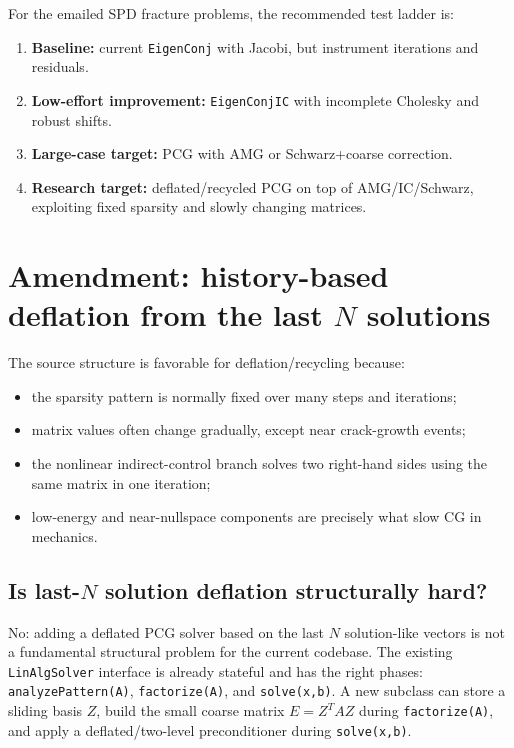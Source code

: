 \documentclass[10pt,a4paper]{article}
\newcommand{\code}[1]{\texttt{#1}}
\begin{document}
For the emailed SPD fracture problems, the recommended test ladder is:
\begin{enumerate}
  \item \textbf{Baseline:} current \code{EigenConj} with Jacobi, but instrument iterations and residuals.
  \item \textbf{Low-effort improvement:} \code{EigenConjIC} with incomplete Cholesky and robust shifts.
  \item \textbf{Large-case target:} PCG with AMG or Schwarz+coarse correction.
  \item \textbf{Research target:} deflated/recycled PCG on top of AMG/IC/Schwarz, exploiting fixed sparsity and slowly changing matrices.
\end{enumerate}


\section{Amendment: history-based deflation from the last $N$ solutions}

The source structure is favorable for deflation/recycling because:
\begin{itemize}
  \item the sparsity pattern is normally fixed over many steps and iterations;
  \item matrix values often change gradually, except near crack-growth events;
  \item the nonlinear indirect-control branch solves two right-hand sides using the same matrix in one iteration;
  \item low-energy and near-nullspace components are precisely what slow CG in mechanics.
\end{itemize}

\subsection*{Is last-$N$ solution deflation structurally hard?}

No: adding a deflated PCG solver based on the last $N$ solution-like vectors is not a fundamental structural problem for the current codebase. The existing \code{LinAlgSolver} interface is already stateful and has the right phases: \code{analyzePattern(A)}, \code{factorize(A)}, and \code{solve(x,b)}. A new subclass can store a sliding basis $Z$, build the small coarse matrix $E=Z^T A Z$ during \code{factorize(A)}, and apply a deflated/two-level preconditioner during \code{solve(x,b)}.
\end{document}
